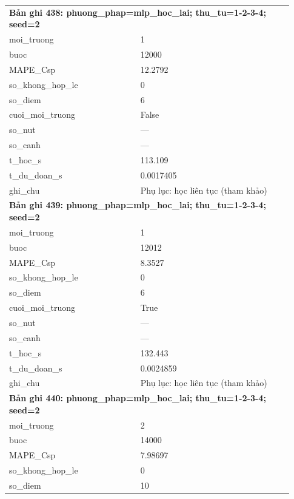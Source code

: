 \begin{longtable}{p{0.43\linewidth}p{0.50\linewidth}}
\midrule
\multicolumn{2}{p{0.95\linewidth}}{\textbf{Bản ghi 438: phuong\_phap=mlp\_hoc\_lai; thu\_tu=1-2-3-4; seed=2}} \\
moi\_\allowbreak truong & 1 \\
buoc & 12000 \\
MAPE\_\allowbreak Csp & 12.2792 \\
so\_\allowbreak khong\_\allowbreak hop\_\allowbreak le & 0 \\
so\_\allowbreak diem & 6 \\
cuoi\_\allowbreak moi\_\allowbreak truong & False \\
so\_\allowbreak nut & — \\
so\_\allowbreak canh & — \\
t\_\allowbreak hoc\_\allowbreak s & 113.109 \\
t\_\allowbreak du\_\allowbreak doan\_\allowbreak s & 0.0017405 \\
ghi\_\allowbreak chu & Phụ lục: học liên tục (tham khảo) \\
\midrule
\multicolumn{2}{p{0.95\linewidth}}{\textbf{Bản ghi 439: phuong\_phap=mlp\_hoc\_lai; thu\_tu=1-2-3-4; seed=2}} \\
moi\_\allowbreak truong & 1 \\
buoc & 12012 \\
MAPE\_\allowbreak Csp & 8.3527 \\
so\_\allowbreak khong\_\allowbreak hop\_\allowbreak le & 0 \\
so\_\allowbreak diem & 6 \\
cuoi\_\allowbreak moi\_\allowbreak truong & True \\
so\_\allowbreak nut & — \\
so\_\allowbreak canh & — \\
t\_\allowbreak hoc\_\allowbreak s & 132.443 \\
t\_\allowbreak du\_\allowbreak doan\_\allowbreak s & 0.0024859 \\
ghi\_\allowbreak chu & Phụ lục: học liên tục (tham khảo) \\
\midrule
\multicolumn{2}{p{0.95\linewidth}}{\textbf{Bản ghi 440: phuong\_phap=mlp\_hoc\_lai; thu\_tu=1-2-3-4; seed=2}} \\
moi\_\allowbreak truong & 2 \\
buoc & 14000 \\
MAPE\_\allowbreak Csp & 7.98697 \\
so\_\allowbreak khong\_\allowbreak hop\_\allowbreak le & 0 \\
so\_\allowbreak diem & 10 \\

\end{longtable}
